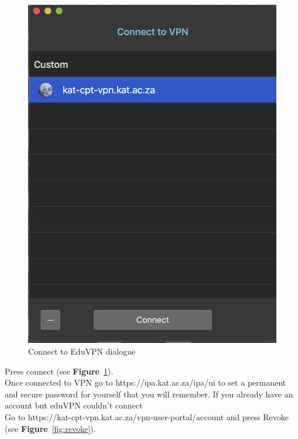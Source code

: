 \begin{figure}[!thb]
	\centering
	\includegraphics[scale=0.5]{Chapters/images/image63.png}
	
	\caption{Connect to EduVPN dialogue }
	\label{fig:image63}
\end{figure}

Press connect (see \textbf{Figure}~\ref{fig:image63}). \\
Once connected to VPN go to https://ipa.kat.ac.za/ipa/ui to set a permanent and secure password for yourself that you will remember.
If you already have an account but eduVPN couldn't connect\\
Go to https://kat-cpt-vpn.kat.ac.za/vpn-user-portal/account and press Revoke (see \textbf{Figure}~\ref{fig:revoke}).



